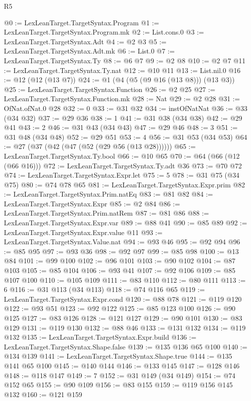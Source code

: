 \begin{lexlean}{R5}
\begin{coremodule}
@0 := LexLeanTarget.TargetSyntax.Program
@1 := LexLeanTarget.TargetSyntax.Program.mk
@2 := List.cons.{0}
@3 := LexLeanTarget.TargetSyntax.Adt
@4 := @2 @3
@5 := LexLeanTarget.TargetSyntax.Adt.mk
@6 := List.{0}
@7 := LexLeanTarget.TargetSyntax.Ty
@8 := @6 @7
@9 := @2 @8
@10 := @2 @7
@11 := LexLeanTarget.TargetSyntax.Ty.nat
@12 := @10 @11
@13 := List.nil.{0}
@16 := @12 (@12 (@13 @7))
@24 := @1 (@4 (@5 (@9 @16 (@13 @8))) (@13 @3))
@25 := LexLeanTarget.TargetSyntax.Function
@26 := @2 @25
@27 := LexLeanTarget.TargetSyntax.Function.mk
@28 := Nat
@29 := @2 @28
@31 := OfNat.ofNat.{0} @28
@32 := 0
@33 := @31 @32
@34 := instOfNatNat
@36 := @33 (@34 @32)
@37 := @29 @36
@38 := 1
@41 := @31 @38 (@34 @38)
@42 := @29 @41
@43 := 2
@46 := @31 @43 (@34 @43)
@47 := @29 @46
@48 := 3
@51 := @31 @48 (@34 @48)
@52 := @29 @51
@53 := 4
@56 := @31 @53 (@34 @53)
@64 := @27 (@37 (@42 (@47 (@52 (@29 @56 (@13 @28))))))
@65 := LexLeanTarget.TargetSyntax.Ty.bool
@66 := @10 @65
@70 := @64 (@66 (@12 (@66 @16)))
@72 := LexLeanTarget.TargetSyntax.Ty.adt @36
@73 := @70 @72
@74 := LexLeanTarget.TargetSyntax.Expr.let
@75 := 5
@78 := @31 @75 (@34 @75)
@80 := @74 @78 @65
@81 := LexLeanTarget.TargetSyntax.Expr.prim
@82 := LexLeanTarget.TargetSyntax.Prim.natEq
@83 := @81 @82
@84 := LexLeanTarget.TargetSyntax.Expr
@85 := @2 @84
@86 := LexLeanTarget.TargetSyntax.Prim.natRem
@87 := @81 @86
@88 := LexLeanTarget.TargetSyntax.Expr.var
@89 := @88 @41
@90 := @85 @89
@92 := LexLeanTarget.TargetSyntax.Expr.value @11
@93 := LexLeanTarget.TargetSyntax.Value.nat
@94 := @93 @46
@95 := @92 @94
@96 := @85 @95
@97 := @93 @36
@98 := @92 @97
@99 := @85 @98
@100 := @13 @84
@101 := @99 @100
@102 := @96 @101
@103 := @90 @102
@104 := @87 @103
@105 := @85 @104
@106 := @93 @41
@107 := @92 @106
@109 := @85 @107 @100
@110 := @105 @109
@111 := @83 @110
@112 := @80 @111
@113 := 6
@116 := @31 @113 (@34 @113)
@118 := @74 @116 @65
@119 := LexLeanTarget.TargetSyntax.Expr.cond
@120 := @88 @78
@121 := @119 @120
@122 := @93 @51
@123 := @92 @122
@125 := @85 @123 @100
@126 := @90 @125
@127 := @83 @126
@128 := @121 @127
@129 := @90 @101
@130 := @83 @129
@131 := @119 @130
@132 := @88 @46
@133 := @131 @132
@134 := @119 @132
@135 := LexLeanTarget.TargetSyntax.Expr.build
@136 := LexLeanTarget.TargetSyntax.Shape.false
@139 := @135 @136 @65 @100
@140 := @134 @139
@141 := LexLeanTarget.TargetSyntax.Shape.true
@144 := @135 @141 @65 @100
@145 := @140 @144
@146 := @133 @145
@147 := @128 @146
@148 := @118 @147
@149 := 7
@152 := @31 @149 (@34 @149)
@154 := @74 @152 @65
@155 := @90 @109
@156 := @83 @155
@159 := @119 @156 @145 @132
@160 := @121 @159

\end{coremodule}
\end{lexlean}
